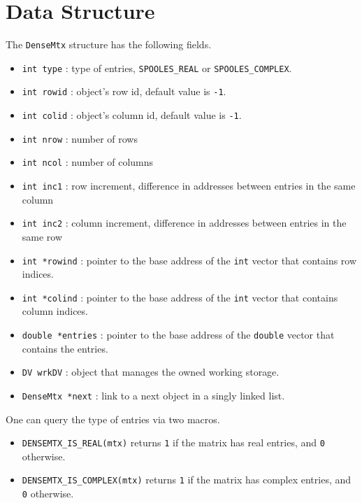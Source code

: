 \par
\section{Data Structure}
\label{section:DenseMtx:dataStructure}
\par
\par
The {\tt DenseMtx} structure has the following fields.
\begin{itemize}
\item
{\tt int type} : type of entries, {\tt SPOOLES\_REAL} 
or {\tt SPOOLES\_COMPLEX}.
\item
{\tt int rowid} : object's row id, default value is {\tt -1}.
\item
{\tt int colid} : object's column id, default value is {\tt -1}.
\item
{\tt int nrow} : number of rows 
\item
{\tt int ncol} : number of columns 
\item
{\tt int inc1} : row increment, 
   difference in addresses between entries in the same column
\item
{\tt int inc2} : column increment, 
   difference in addresses between entries in the same row
\item
{\tt int *rowind} : 
pointer to the base address of the {\tt int} vector 
that contains row indices.
\item
{\tt int *colind} : 
pointer to the base address of the {\tt int} vector 
that contains column indices.
\item
{\tt double *entries} : 
pointer to the base address of the {\tt double} vector that
contains the entries.
\item
{\tt DV wrkDV} : 
object that manages the owned working storage.
\item
{\tt DenseMtx *next} : 
link to a next object in a singly linked list.
\end{itemize}
\par
One can query the type of entries via two macros.
\begin{itemize}
\item
{\tt DENSEMTX\_IS\_REAL(mtx)} returns {\tt 1} if the matrix has
real entries, and {\tt 0} otherwise.
\item
{\tt DENSEMTX\_IS\_COMPLEX(mtx)} returns {\tt 1} if the matrix has
complex entries, and {\tt 0} otherwise.
\end{itemize}
